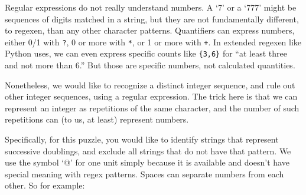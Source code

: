 Regular expressions do not really understand numbers. A `7' or a `777'
might be sequences of digits matched in a string, but they are not
fundamentally different, to regexen, than any other character patterns.
Quantifiers can express numbers, either 0/1 with \texttt{?}, 0 or more
with \texttt{*}, or 1 or more with \texttt{+}. In extended regexen like
Python uses, we can even express specific counts like \texttt{\{3,6\}}
for ``at least three and not more than 6.'' But those are specific
numbers, not calculated quantities.

Nonetheless, we would like to recognize a distinct integer sequence, and
rule out other integer sequences, using a regular expression. The trick
here is that we can represent an integer as repetitions of the same
character, and the number of such repetitions can (to us, at least)
represent numbers.

Specifically, for this puzzle, you would like to identify strings that
represent successive doublings, and exclude all strings that do not have
that pattern. We use the symbol `@' for one unit simply because it is
available and doesn't have special meaning with regex patterns. Spaces
can separate numbers from each other. So for example:

\begin{Shaded}
\begin{Highlighting}[]
\OperatorTok{\textgreater{}\textgreater{}\textgreater{}}\OperatorTok{=}  
\OperatorTok{\textgreater{}\textgreater{}\textgreater{}}\OperatorTok{=}  
\OperatorTok{\textgreater{}\textgreater{}\textgreater{}}\OperatorTok{=}  
\OperatorTok{\textgreater{}\textgreater{}\textgreater{}}\OperatorTok{=}  
\OperatorTok{\textgreater{}\textgreater{}\textgreater{}} 
\OperatorTok{=}
\NormalTok{(}
\NormalTok{:}
\NormalTok{(}
  
    
   
   
\end{Highlighting}
\end{Shaded}

